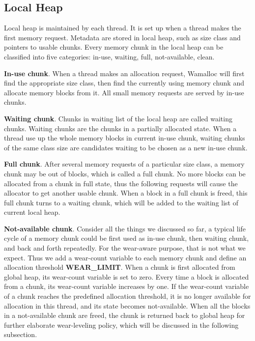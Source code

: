 \documentclass[10pt, conference, compsocconf]{IEEEtran}
\begin{document}
\subsection{Local Heap}

Local heap is maintained by each thread. 
It is set up when a thread makes the first memory request.
Metadata are stored in local heap, such as size class and pointers to usable chunks.
Every memory chunk in the local heap can be classified into five categories: in-use, waiting, full, not-available, clean.


\textbf{In-use chunk}. 
When a thread makes an allocation request, 
Wamalloc will first find the appropriate size class, 
then find the currently using memory chunk and allocate memory blocks from it.
All small memory requests are served by in-use chunks.

\textbf{Waiting chunk}. 
Chunks in waiting list of the local heap are called waiting chunks. 
Waiting chunks are the chunks in a partially allocated state. 
When a thread use up the whole memory blocks in current in-use chunk,
waiting chunks of the same class size are candidates waiting to be chosen as a new in-use chunk.

\textbf{Full chunk}. 
After several memory requests of a particular size class, 
a memory chunk may be out of blocks, which is called a full chunk.
No more blocks can be allocated from a chunk in full state, 
thus the following requests will cause the allocator to get another usable chunk.
When a block in a full chunk is freed,
this full chunk turns to a waiting chunk, which will be added to the waiting list of current local heap.

\textbf{Not-available chunk}.
Consider all the things we discussed so far, 
a typical life cycle of a memory chunk could be first used as in-use chunk, then waiting chunk, and back and forth repeatedly. 
For the wear-aware purpose, that is not what we expect. 
Thus we add a wear-count variable to each memory chunk and define an allocation threshold \textbf{WEAR\_LIMIT}.
When a chunk is first allocated from global heap, its wear-count variable is set to zero.
Every time a block is allocated from a chunk, its wear-count variable increases by one. 
If the wear-count variable of a chunk reaches the predefined allocation threshold, 
it is no longer available for allocation in this thread, and its state becomes not-available. 
When all the blocks in a not-available chunk are freed,
the chunk is returned back to global heap for further elaborate wear-leveling policy, 
which will be discussed in the following subsection.
\end{document}
